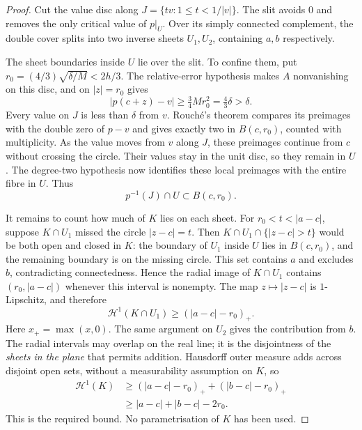 \documentclass[11pt]{article}
\begin{document}
\begin{proof}
Cut the value disc along $J=\{tv:1\le t<1/|v|\}$. The slit avoids
$0$ and removes the only critical value of $p|_U$. Over its simply
connected complement, the double cover splits into two inverse sheets
$U_1,U_2$, containing $a,b$ respectively.

The sheet boundaries inside $U$ lie over the slit. To confine them,
put $r_0=(4/3)\sqrt{\delta/M}<2h/3$. The relative-error hypothesis
makes $A$ nonvanishing on this disc, and on $|z|=r_0$ gives
\[
 |p(c+z)-v|\ge\tfrac34Mr_0^2=\tfrac43\delta>\delta.
\]
Every value on $J$ is less than $\delta$ from $v$. Rouch\'e's theorem
compares its preimages with the double zero of $p-v$ and gives exactly
two in $B(c,r_0)$, counted with multiplicity. As the value moves from
$v$ along $J$, these preimages continue from $c$ without crossing the
circle. Their values stay in the unit disc, so they remain in $U$.
The degree-two hypothesis now identifies these local preimages with the
entire fibre in $U$. Thus
\[
 p^{-1}(J)\cap U\subset B(c,r_0).
\]

It remains to count how much of $K$ lies on each sheet. For
$r_0<t<|a-c|$, suppose $K\cap U_1$ missed the circle $|z-c|=t$.
Then $K\cap U_1\cap\{|z-c|>t\}$ would be both open and closed in $K$:
the boundary of $U_1$ inside $U$ lies in $B(c,r_0)$, and the remaining
boundary is on the missing circle. This set contains $a$ and excludes
$b$, contradicting connectedness. Hence the radial image of $K\cap U_1$
contains $(r_0,|a-c|)$ whenever this interval is nonempty. The map
$z\mapsto|z-c|$ is $1$-Lipschitz, and therefore
\[
 \mathcal H^1(K\cap U_1)\ge(|a-c|-r_0)_+.
\]
Here $x_+=\max(x,0)$. The same argument on $U_2$ gives the contribution
from $b$. The radial intervals may overlap on the real line; it is the
disjointness of the \emph{sheets in the plane} that permits addition. Hausdorff outer
measure adds across disjoint open sets, without a measurability
assumption on $K$, so
\begin{align*}
 \mathcal H^1(K)
 &\ge (|a-c|-r_0)_+ + (|b-c|-r_0)_+\\
 &\ge |a-c|+|b-c|-2r_0.
\end{align*}
This is the required bound. No parametrisation of $K$ has been used.
\end{proof}
\end{document}
